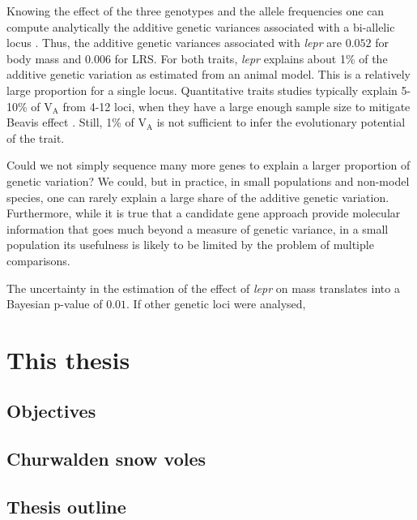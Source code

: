 Knowing the effect of the three genotypes and the allele frequencies one can compute analytically the additive genetic variances associated with a bi-allelic locus \parencite[][p77]{Fisher1941average,Lynch1998}. Thus, the additive genetic variances associated with \emph{lepr} are $0.052$  for body mass and $0.006$ for LRS. For both traits, \emph{lepr} explains about 1\% of the additive genetic variation as estimated from an animal model. This is a relatively large proportion for a single locus. Quantitative traits studies typically explain 5-10\% of V$_\text{A}$ from 4-12 loci, when they have a large enough sample size to mitigate Beavis effect \parencite{Jensen2014}.  Still, 1\% of V$_\text{A}$ is not sufficient to infer the evolutionary potential of the trait.

Could we not simply sequence many more genes to explain a larger proportion of genetic variation? We could, but in practice, in small populations and non-model species, one can rarely explain a large share of the additive genetic variation. 
Furthermore, while it is true that a candidate gene approach provide molecular information that goes much beyond a measure of genetic variance, in a small population its usefulness is likely to be limited by the problem of multiple comparisons. 

The uncertainty in the estimation of the effect of \emph{lepr} on mass translates into a Bayesian p-value of $0.01$. 
If other genetic loci were analysed, 


\section{This thesis}

\subsection{Objectives}

\subsection{Churwalden snow voles}

\subsection{Thesis outline}

\printbibliography[heading=subbibliography]

